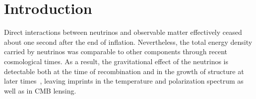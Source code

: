 \begin{quotation}
%

\end{quotation}

\section{Introduction}



Direct interactions between neutrinos and observable matter effectively ceased about one second after the end of inflation.  Nevertheless, the total energy density carried by neutrinos was comparable to other components through recent cosmological times.  As a result, the gravitational effect of the neutrinos is detectable both at the time of recombination and in the growth of structure at later times~\cite{Abazajian:2013oma}, leaving imprints in the temperature and polarization spectrum as well as in CMB lensing.

